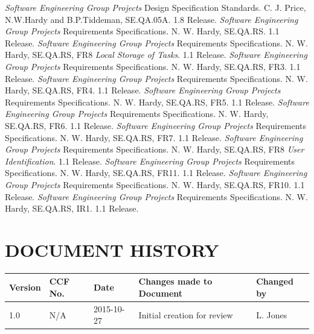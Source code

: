 \documentclass{project}
\begin{document}
\begin{thebibliography}{12}
 \emph{Software Engineering Group Projects}
Design Specification Standards.
C. J. Price, N.W.Hardy and B.P.Tiddeman, SE.QA.05A. 1.8 Release.
 \emph{Software Engineering Group Projects}
Requirements Specifications.
N. W. Hardy, SE.QA.RS. 1.1 Release.
 \emph{Software Engineering Group Projects}
Requirements Specifications.
N. W. Hardy, SE.QA.RS, FR8 \emph{Local Storage of Tasks}. 1.1 Release.
 \emph{Software Engineering Group Projects}
Requirements Specifications.
N. W. Hardy, SE.QA.RS, FR3. 1.1 Release.
 \emph{Software Engineering Group Projects}
Requirements Specifications.
N. W. Hardy, SE.QA.RS, FR4. 1.1 Release.
 \emph{Software Engineering Group Projects}
Requirements Specifications.
N. W. Hardy, SE.QA.RS, FR5. 1.1 Release.
 \emph{Software Engineering Group Projects}
Requirements Specifications.
N. W. Hardy, SE.QA.RS, FR6. 1.1 Release.
 \emph{Software Engineering Group Projects}
Requirements Specifications.
N. W. Hardy, SE.QA.RS, FR7. 1.1 Release.
 \emph{Software Engineering Group Projects}
Requirements Specifications.
N. W. Hardy, SE.QA.RS, FR8 \emph{User Identification}. 1.1 Release.
 \emph{Software Engineering Group Projects}
Requirements Specifications.
N. W. Hardy, SE.QA.RS, FR11. 1.1 Release.
 \emph{Software Engineering Group Projects}
Requirements Specifications.
N. W. Hardy, SE.QA.RS, FR10. 1.1 Release.
 \emph{Software Engineering Group Projects}
Requirements Specifications.
N. W. Hardy, SE.QA.RS, IR1. 1.1 Release.
\end{thebibliography}
\clearpage
{}
\section*{DOCUMENT HISTORY}
\begin{tabular}{|l | l | l | l | l |}
\hline
Version & CCF No. & Date & Changes made to Document & Changed by \\
\hline
1.0 & N/A & 2015-10-27 & Initial creation for review & L. Jones \\
\hline
\end{tabular}
\label{thelastpage}
\end{document}
